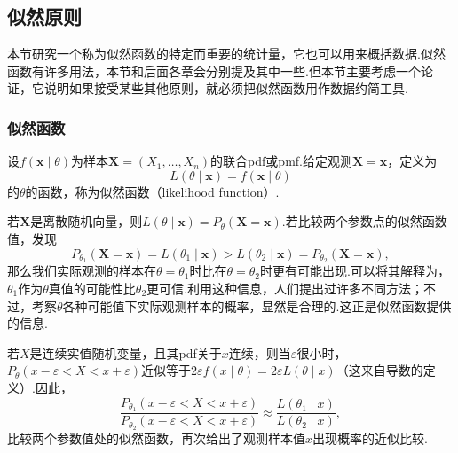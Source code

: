 \subsection{似然原则}\label{sec:6.3}
本节研究一个称为似然函数的特定而重要的统计量，它也可以用来概括数据.似然函数有许多用法，本节和后面各章会分别提及其中一些.但本节主要考虑一个论证，它说明如果接受某些其他原则，就必须把似然函数用作数据约简工具.
\subsubsection{似然函数}\label{sec:6.3.1}
\begin{definition}\label{def:6.3.1}
设$f(\boldsymbol x\mid\theta)$为样本$\boldsymbol X=(X_1,\ldots,X_n)$的联合pdf或pmf.给定观测$\boldsymbol X=\boldsymbol x$，定义为
$$L(\theta\mid\boldsymbol x)=f(\boldsymbol x\mid\theta)$$
的$\theta$的函数，称为似然函数（likelihood function）.
\end{definition}
若$\boldsymbol X$是离散随机向量，则$L(\theta\mid\boldsymbol x)=P_\theta(\boldsymbol X=\boldsymbol x)$.若比较两个参数点的似然函数值，发现
$$P_{\theta_1}(\boldsymbol X=\boldsymbol x)=L(\theta_1\mid\boldsymbol x)>L(\theta_2\mid\boldsymbol x)=P_{\theta_2}(\boldsymbol X=\boldsymbol x),$$
那么我们实际观测的样本在$\theta=\theta_1$时比在$\theta=\theta_2$时更有可能出现.可以将其解释为，$\theta_1$作为$\theta$真值的可能性比$\theta_2$更可信.利用这种信息，人们提出过许多不同方法；不过，考察$\theta$各种可能值下实际观测样本的概率，显然是合理的.这正是似然函数提供的信息.

若$X$是连续实值随机变量，且其pdf关于$x$连续，则当$\varepsilon$很小时，$P_\theta(x-\varepsilon<X<x+\varepsilon)$近似等于$2\varepsilon f(x\mid\theta)=2\varepsilon L(\theta\mid x)$（这来自导数的定义）.因此，
$$\frac{P_{\theta_1}(x-\varepsilon<X<x+\varepsilon)}{P_{\theta_2}(x-\varepsilon<X<x+\varepsilon)}\approx\frac{L(\theta_1\mid x)}{L(\theta_2\mid x)},$$
比较两个参数值处的似然函数，再次给出了观测样本值$x$出现概率的近似比较.

